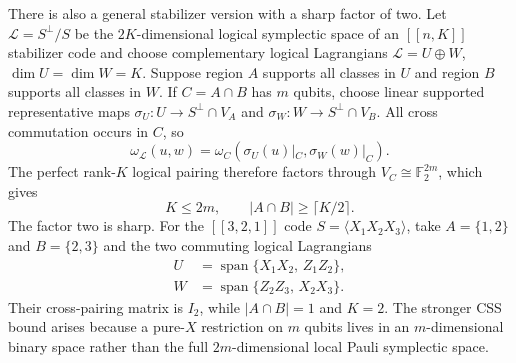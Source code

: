 \documentclass[aps,prx,reprint,superscriptaddress,nofootinbib,floatfix,longbibliography]{revtex4-2}
\theoremstyle{definition}
\begin{document}
There is also a general stabilizer version with a sharp factor of two.  Let
$\mathcal L=S^\perp/S$ be the $2K$-dimensional logical symplectic space of an
$[[n,K]]$ stabilizer code and choose complementary logical Lagrangians
$\mathcal L=U\oplus W$, $\dim U=\dim W=K$.  Suppose region $A$ supports all
classes in $U$ and region $B$ supports all classes in $W$.  If
$C=A\cap B$ has $m$ qubits, choose linear supported representative maps
$\sigma_U:U\to S^\perp\cap V_A$ and
$\sigma_W:W\to S^\perp\cap V_B$.  All cross commutation occurs in $C$, so
\begin{equation}
 \omega_{\mathcal L}(u,w)
 =\omega_C\!\left(\sigma_U(u)|_C,\sigma_W(w)|_C\right). \tag{S14}
\end{equation}
The perfect rank-$K$ logical pairing therefore factors through
$V_C\cong\mathbb F_2^{2m}$, which gives
\begin{equation}
 K\le2m,\qquad |A\cap B|\ge\lceil K/2\rceil. \tag{S15}
\end{equation}
The factor two is sharp.  For the $[[3,2,1]]$ code
$S=\langle X_1X_2X_3\rangle$, take $A=\{1,2\}$ and $B=\{2,3\}$ and the two
commuting logical Lagrangians
\begin{align*}
 U&=\operatorname{span}\{X_1X_2,\,Z_1Z_2\},\\
 W&=\operatorname{span}\{Z_2Z_3,\,X_2X_3\}.
\end{align*}
Their cross-pairing matrix is $I_2$, while $|A\cap B|=1$ and $K=2$.
The stronger CSS bound arises because a pure-$X$ restriction on $m$ qubits
lives in an $m$-dimensional binary space rather than the full $2m$-dimensional
local Pauli symplectic space.
\end{document}
